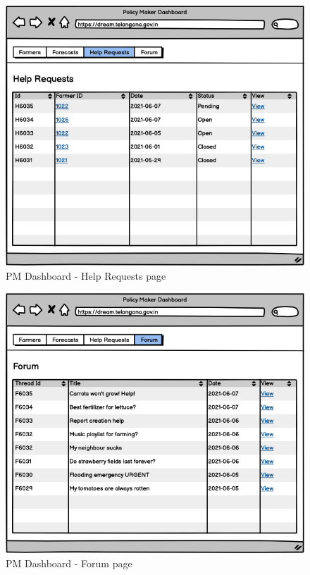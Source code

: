 \documentclass[10pt]{article}
\begin{document}
\begin{figure}[ht!]
    \centering
    \includegraphics[scale=0.40]{ui/pm_helprequests.png}
    \caption{PM Dashboard - Help Requests page}
\end{figure}
\begin{figure}[ht!]
    \centering
    \includegraphics[scale=0.40]{ui/pm_forum.png}
    \caption{PM Dashboard - Forum page}
\end{figure}
\end{document}

